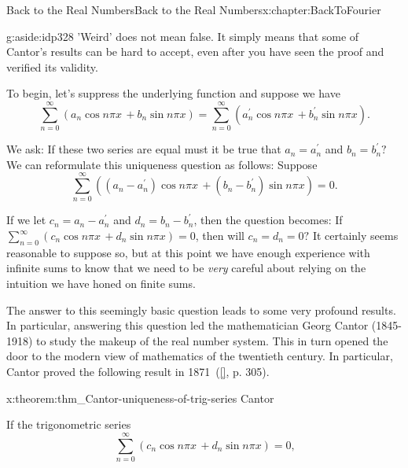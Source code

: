 \begin{chapterptx}{Back to the Real Numbers}{}{Back to the Real Numbers}{}{}{x:chapter:BackToFourier}
\begin{introduction}{}
		\begin{aside}{}{g:aside:idp328}%
			'Weird' does not mean false.  It simply means that some of Cantor's results can be hard to accept, even after you have seen the proof and verified its validity.%
		\end{aside}
		To begin, let's suppress the underlying function and suppose we have%
		\begin{equation*}
			\sum_{n=0}^\infty(a_n\cos n\pi x\,+b_n\sin n\pi x) = \sum_{n=0}^\infty(a^\prime_n\cos n\pi x\,+b^\prime_n\sin n\pi x)\text{.}
		\end{equation*}
		\par
		We ask: If these two series are equal must it be true that \(a_n=a^\prime_n\) and \(b_n=b^\prime_n?\) We can reformulate this uniqueness question as follows: Suppose%
		\begin{equation*}
			\sum_{n=0}^\infty\left((a_n-a^\prime_n)\cos n\pi x\,+(b_n-b^\prime_n)\sin n\pi x\right) = 0\text{.}
		\end{equation*}
		\par
		If we let \(c_n = a_n-a^\prime_n\) and \(d_n = b_n-b^\prime_n\), then the question becomes: If \(\sum_{n=0}^\infty\left(c_n\cos n\pi x\,+d_n\sin n\pi x\right) = 0\), then will \(c_n=d_n=0?\) It certainly seems reasonable to suppose so, but at this point we have enough experience with infinite sums to know that we need to be \emph{very} careful about relying on the intuition we have honed on finite sums.%
		\par
		 The answer to this seemingly basic question leads to some very profound results.  In particular, answering this question led the mathematician Georg Cantor (1845-1918) to study the makeup of the real number system.  This in turn opened the door to the modern view of mathematics of the twentieth century.  In particular, Cantor proved the following result in 1871~(\hyperlink{x:biblio:jahnke03__histor_analy}{[{}]}, p. 305).%
		\begin{theorem}{}{}{x:theorem:thm_Cantor-uniqueness-of-trig-series}%
			\alert{Cantor}%
			\par
			 If the trigonometric series%
			\begin{equation*}
				\sum_{n=0}^\infty\left(c_n\cos n\pi  x\,+d_n\sin n\pi x\right) = 0\text{,}
			\end{equation*}

\end{theorem}
\end{introduction}
\end{chapterptx}
